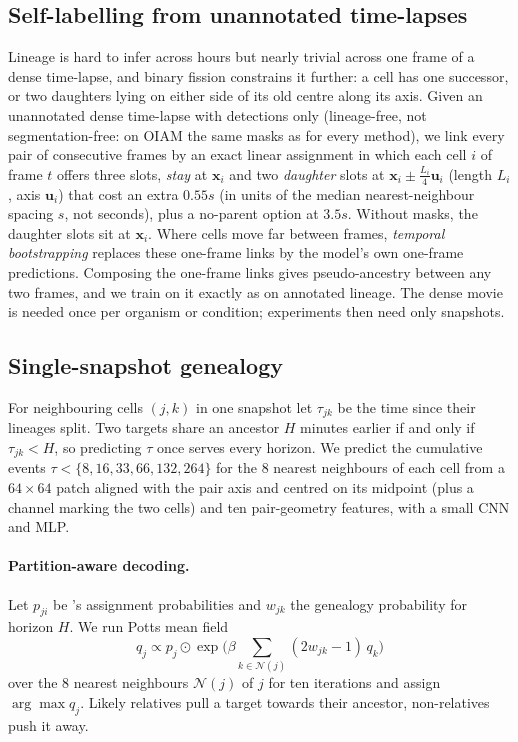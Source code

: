 \subsection{Self-labelling from unannotated time-lapses}
\label{sec:selflabel}
Lineage is hard to infer across hours but nearly trivial across one frame of a dense time-lapse, and binary fission constrains it further: a cell has one successor, or two daughters lying on either side of its old centre along its axis.
Given an unannotated dense time-lapse with detections only (lineage-free, not segmentation-free: on OIAM the same masks as for every method), we link every pair of consecutive frames by an exact linear assignment in which each cell $i$ of frame $t$ offers three slots, \emph{stay} at $\mathbf{x}_i$ and two \emph{daughter} slots at $\mathbf{x}_i\pm\tfrac{L_i}{4}\mathbf{u}_i$ (length $L_i$, axis $\mathbf{u}_i$) that cost an extra $0.55s$ (in units of the median nearest-neighbour spacing $s$, not seconds), plus a no-parent option at $3.5s$.
Without masks, the daughter slots sit at $\mathbf{x}_i$.
Where cells move far between frames, \emph{temporal bootstrapping} replaces these one-frame links by the \rodsim model's own one-frame predictions.
Composing the one-frame links gives pseudo-ancestry between any two frames, and we train \ours on it exactly as on annotated lineage.
The dense movie is needed once per organism or condition; experiments then need only snapshots.

\subsection{Single-snapshot genealogy}
\label{sec:genealogy}

For neighbouring cells $(j,k)$ in one snapshot let $\tau_{jk}$ be the time since their lineages split.
Two targets share an ancestor $H$ minutes earlier if and only if $\tau_{jk}<H$, so predicting $\tau$ once serves every horizon.
We predict the cumulative events $\tau<\{8,16,33,66,132,264\}$ for the $8$ nearest neighbours of each cell from a $64{\times}64$ patch aligned with the pair axis and centred on its midpoint (plus a channel marking the two cells) and ten pair-geometry features, with a small CNN and MLP.

\paragraph{Partition-aware decoding.}
Let $p_{ji}$ be \ours's assignment probabilities and $w_{jk}$ the genealogy probability for horizon $H$.
We run Potts mean field
\begin{equation}
q_j \propto p_j \odot \exp\Big(\beta\sum_{k\in\mathcal{N}(j)}(2w_{jk}-1)\,q_k\Big)
\end{equation}
over the 8 nearest neighbours $\mathcal{N}(j)$ of $j$ for ten iterations and assign $\arg\max q_j$.
Likely relatives pull a target towards their ancestor, non-relatives push it away.

